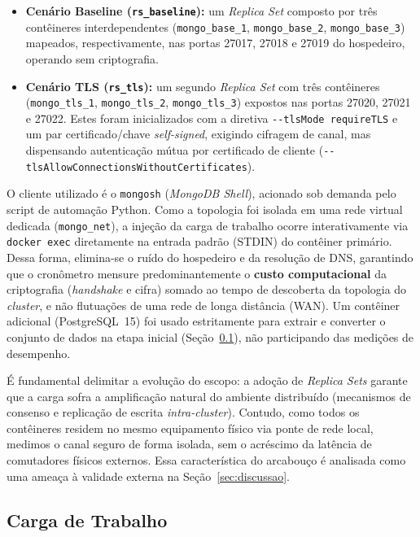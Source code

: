 \documentclass[12pt]{article}
\begin{document}
\begin{itemize}
  \item \textbf{Cenário Baseline (\texttt{rs\_baseline}):} um \emph{Replica Set} composto por três contêineres interdependentes (\texttt{mongo\_base\_1}, \texttt{mongo\_base\_2}, \texttt{mongo\_base\_3}) mapeados, respectivamente, nas portas 27017, 27018 e 27019 do hospedeiro, operando sem criptografia.
  \item \textbf{Cenário TLS (\texttt{rs\_tls}):} um segundo \emph{Replica Set} com três contêineres (\texttt{mongo\_tls\_1}, \texttt{mongo\_tls\_2}, \texttt{mongo\_tls\_3}) expostos nas portas 27020, 27021 e 27022. Estes foram inicializados com a diretiva \texttt{-{}-tlsMode requireTLS} e um par certificado/chave \emph{self-signed}, exigindo cifragem de canal, mas dispensando autenticação mútua por certificado de cliente (\texttt{-{}-tlsAllowConnectionsWithoutCertificates}).
\end{itemize}

O cliente utilizado é o \texttt{mongosh} (\emph{MongoDB Shell}), acionado sob demanda pelo script de automação Python. Como a topologia foi isolada em uma rede virtual dedicada (\texttt{mongo\_net}), a injeção da carga de trabalho ocorre interativamente via \texttt{docker exec} diretamente na entrada padrão (STDIN) do contêiner primário. Dessa forma, elimina-se o ruído do hospedeiro e da resolução de DNS, garantindo que o cronômetro mensure predominantemente o \textbf{custo computacional} da criptografia (\emph{handshake} e cifra) somado ao tempo de descoberta da topologia do \emph{cluster}, e não flutuações de uma rede de longa distância (WAN). Um contêiner adicional (PostgreSQL~15) foi usado estritamente para extrair e converter o conjunto de dados na etapa inicial (Seção~\ref{sec:met-carga}), não participando das medições de desempenho.

É fundamental delimitar a evolução do escopo: a adoção de \emph{Replica Sets} garante que a carga sofra a amplificação natural do ambiente distribuído (mecanismos de consenso e replicação de escrita \emph{intra-cluster}). Contudo, como todos os contêineres residem no mesmo equipamento físico via ponte de rede local, medimos o canal seguro de forma isolada, sem o acréscimo da latência de comutadores físicos externos. Essa característica do arcabouço é analisada como uma ameaça à validade externa na Seção~\ref{sec:discussao}.

\subsection{Carga de Trabalho}
\label{sec:met-carga}
\end{document}
